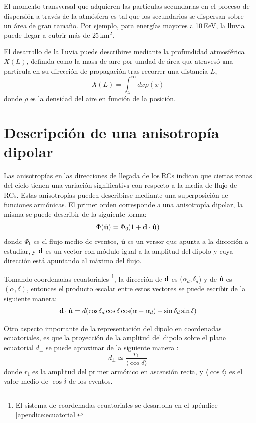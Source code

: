 El momento transversal que adquieren las partículas secundarias en el proceso de dispersión a través de la atmósfera es tal que los secundarios se dispersan sobre un área de gran tamaño. Por ejemplo, para energías mayores a 10$\,$EeV,  la lluvia puede llegar a cubrir más de 25\,km$^2$. 

El desarrollo de la lluvia puede describirse mediante la profundidad atmosférica $X(L)$, definida como la masa de aire por unidad de área que atravesó una partícula en su dirección de propagación tras recorrer una distancia $L$, 
\begin{equation}
	X(L)= \int_L^\infty dx \rho(x)
\end{equation}
donde $\rho$ es la densidad del aire en función de la posición.


\section{Descripción de una anisotropía dipolar}
Las anisotropías en las direcciones de llegada de los RCs indican que ciertas zonas del cielo tienen una variación significativa con respecto a la media de flujo de RCs. Estas anisotropías pueden describirse mediante una superposición de funciones armónicas. El primer orden corresponde a una anisotropía dipolar, la misma se puede describir de la siguiente forma:
\begin{equation}
    \Phi(\hat{\bf{u}}) = \Phi_0(1+\bf{d}\cdot\hat{\bf{u}})
    \label{eq:dipolo_general}
\end{equation}
\noindent donde $\Phi_0$ es el flujo medio de eventos, $\hat{\bf{u}}$ es un versor que apunta a la dirección a estudiar, y $\bf{d}$ es un vector con módulo igual a la amplitud del dipolo y cuya dirección está apuntando al máximo del flujo. 

Tomando coordenadas ecuatoriales \footnote{El sistema de coordenadas ecuatoriales se desarrolla en el apéndice \ref{apendice:ecuatorial}}, la dirección de $\bf{d}$ es $(\alpha_d, \delta_d$) y de $\hat{\bf{u}}$ es $(\alpha, \delta)$, entonces  el producto escalar  entre estos vectores se puede escribir de la siguiente manera:
\begin{equation}
    \textbf{d}\cdot\hat{\bf{u}}= d (\cos\delta_d \cos\delta \cos(\alpha - \alpha_d) + \sin\delta_d  \sin\delta)
    \label{eq:product_ud}
\end{equation}

Otro aspecto importante de la representación del dipolo en coordenadas ecuatoriales, es que la proyección de la amplitud del dipolo sobre el plano ecuatorial $d_\perp$ se puede aproximar de la siguiente manera \cite{taborda} :
\begin{equation}
    d_\perp \simeq \frac{r_1}{ \langle \cos\delta \rangle}
    \label{eq:fourier_perp}
\end{equation}
donde $r_1$ es la amplitud del primer armónico en ascensión recta, y $\langle \cos\delta \rangle$ es el valor medio de $\cos\delta $ de los eventos.

